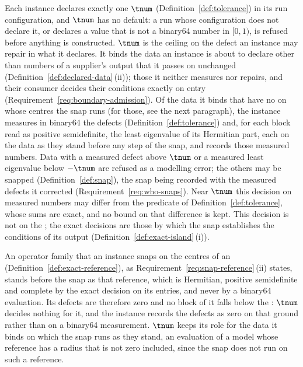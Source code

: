 \begin{requirement}\label{req:declared-tolerance}
Each instance declares exactly one  $\tnum$
(Definition~\ref{def:tolerance}) in its run configuration, and $\tnum$ has no
default: a run whose configuration does not declare it, or declares a value
that is not a binary64 number in $[0,1)$, is refused before anything is
constructed. $\tnum$ is the ceiling on the defect an instance may repair in
what it declares. It binds the data an instance is about to declare other than
numbers of a supplier's output that it passes on unchanged
(Definition~\ref{def:declared-data}\,(ii)); those it neither measures nor
repairs, and their consumer decides their conditions exactly on entry
(Requirement~\ref{req:boundary-admission}). Of the data it binds that have no
 on whose centres the snap runs (for those, see the
next paragraph), the instance
measures in binary64 the defects (Definition~\ref{def:tolerance}) and, for each
block read as positive semidefinite, the least eigenvalue of its Hermitian
part, each on the data as they stand before any step of the snap, and records
those measured numbers. Data with a measured defect above $\tnum$ or a
measured least eigenvalue below $-\tnum$ are refused as a modelling error; the
others may be snapped (Definition~\ref{def:snap}), the snap being recorded
with the measured defects it corrected (Requirement~\ref{req:who-snaps}). Near
$\tnum$ this decision on measured numbers may differ from the predicate
\emph{} of Definition~\ref{def:tolerance},
whose sums are exact, and no bound on that difference is kept. This decision
is not on the ; the exact decisions are those by which the
snap establishes the conditions of its output
(Definition~\ref{def:exact-island}\,(i)).

An operator family that an instance snaps on the centres of an
 (Definition~\ref{def:exact-reference}), as
Requirement~\ref{req:snap-reference}\,(ii) states, stands before the snap as
that reference, which is Hermitian, positive semidefinite and complete by the
exact decision on its entries, and never by a binary64 evaluation. Its defects are
therefore zero and no block of it falls below the :
$\tnum$ decides nothing for it, and the instance records the defects as zero
on that ground rather than on a binary64 measurement. $\tnum$ keeps its role
for the data it binds on which the snap runs as they stand, an evaluation of
a model whose reference has a radius that is not zero included, since the
snap does not run on such a reference.


\end{requirement}
